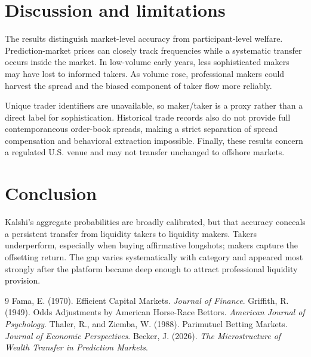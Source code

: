 \documentclass[10pt]{article}
\begin{document}
\section{Discussion and limitations}
The results distinguish market-level accuracy from participant-level welfare. Prediction-market prices can closely track frequencies while a systematic transfer occurs inside the market. In low-volume early years, less sophisticated makers may have lost to informed takers. As volume rose, professional makers could harvest the spread and the biased component of taker flow more reliably.

Unique trader identifiers are unavailable, so maker/taker is a proxy rather than a direct label for sophistication. Historical trade records also do not provide full contemporaneous order-book spreads, making a strict separation of spread compensation and behavioral extraction impossible. Finally, these results concern a regulated U.S. venue and may not transfer unchanged to offshore markets.

\section{Conclusion}
Kalshi's aggregate probabilities are broadly calibrated, but that accuracy conceals a persistent transfer from liquidity takers to liquidity makers. Takers underperform, especially when buying affirmative longshots; makers capture the offsetting return. The gap varies systematically with category and appeared most strongly after the platform became deep enough to attract professional liquidity provision.

\begin{thebibliography}{9}\small
{} Fama, E. (1970). Efficient Capital Markets. \textit{Journal of Finance}.
 Griffith, R. (1949). Odds Adjustments by American Horse-Race Bettors. \textit{American Journal of Psychology}.
 Thaler, R., and Ziemba, W. (1988). Parimutuel Betting Markets. \textit{Journal of Economic Perspectives}.
 Becker, J. (2026). \textit{The Microstructure of Wealth Transfer in Prediction Markets}.
\end{thebibliography}
\end{document}
